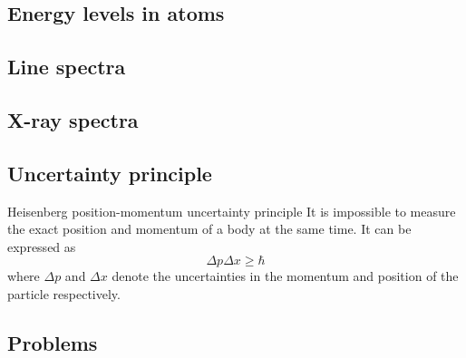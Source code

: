 \subsection{Energy levels in atoms}


\subsection{Line spectra}


\subsection{X-ray spectra}


\subsection{Uncertainty principle}
\begin{defn}{Heisenberg position-momentum uncertainty principle}{}
It is impossible to measure the exact position and momentum of a body at the same time. It can be expressed as
\begin{equation}
\Delta p \Delta x \ge \hbar
\end{equation}
where $\Delta p$ and $\Delta x$ denote the uncertainties in the momentum and position of the particle respectively.
\end{defn}

\subsection*{Problems}

\pagebreak